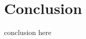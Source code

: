 \chapter{Conclusion}
\label{chap-conclusion}
\begin{ChapAbstract}
conclusion here
\end{ChapAbstract}

